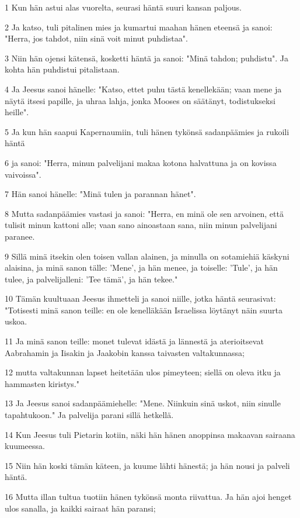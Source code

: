 \par 1 Kun hän astui alas vuorelta, seurasi häntä suuri kansan paljous.
\par 2 Ja katso, tuli pitalinen mies ja kumartui maahan hänen eteensä ja sanoi: "Herra, jos tahdot, niin sinä voit minut puhdistaa".
\par 3 Niin hän ojensi kätensä, kosketti häntä ja sanoi: "Minä tahdon; puhdistu". Ja kohta hän puhdistui pitalistaan.
\par 4 Ja Jeesus sanoi hänelle: "Katso, ettet puhu tästä kenellekään; vaan mene ja näytä itsesi papille, ja uhraa lahja, jonka Mooses on säätänyt, todistukseksi heille".
\par 5 Ja kun hän saapui Kapernaumiin, tuli hänen tykönsä sadanpäämies ja rukoili häntä
\par 6 ja sanoi: "Herra, minun palvelijani makaa kotona halvattuna ja on kovissa vaivoissa".
\par 7 Hän sanoi hänelle: "Minä tulen ja parannan hänet".
\par 8 Mutta sadanpäämies vastasi ja sanoi: "Herra, en minä ole sen arvoinen, että tulisit minun kattoni alle; vaan sano ainoastaan sana, niin minun palvelijani paranee.
\par 9 Sillä minä itsekin olen toisen vallan alainen, ja minulla on sotamiehiä käskyni alaisina, ja minä sanon tälle: 'Mene', ja hän menee, ja toiselle: 'Tule', ja hän tulee, ja palvelijalleni: 'Tee tämä', ja hän tekee."
\par 10 Tämän kuultuaan Jeesus ihmetteli ja sanoi niille, jotka häntä seurasivat: "Totisesti minä sanon teille: en ole kenelläkään Israelissa löytänyt näin suurta uskoa.
\par 11 Ja minä sanon teille: monet tulevat idästä ja lännestä ja aterioitsevat Aabrahamin ja Iisakin ja Jaakobin kanssa taivasten valtakunnassa;
\par 12 mutta valtakunnan lapset heitetään ulos pimeyteen; siellä on oleva itku ja hammasten kiristys."
\par 13 Ja Jeesus sanoi sadanpäämiehelle: "Mene. Niinkuin sinä uskot, niin sinulle tapahtukoon." Ja palvelija parani sillä hetkellä.
\par 14 Kun Jeesus tuli Pietarin kotiin, näki hän hänen anoppinsa makaavan sairaana kuumeessa.
\par 15 Niin hän koski tämän käteen, ja kuume lähti hänestä; ja hän nousi ja palveli häntä.
\par 16 Mutta illan tultua tuotiin hänen tykönsä monta riivattua. Ja hän ajoi henget ulos sanalla, ja kaikki sairaat hän paransi;
